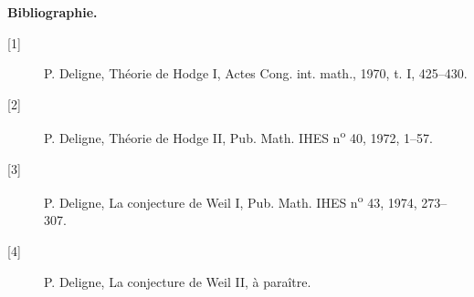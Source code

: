 
\begin{center}\textbf{Bibliographie.}\end{center}
\begin{description}
\item[{[1]}] P. Deligne, Théorie de Hodge I, Actes Cong. int. math., 1970, t. I, 425--430.
\item[{[2]}] P. Deligne, Théorie de Hodge II, Pub. Math. IHES n\textsuperscript{o} 40, 1972, 1--57.
\item[{[3]}] P. Deligne, La conjecture de Weil I, Pub. Math. IHES n\textsuperscript{o} 43, 1974, 273--307.
\item[{[4]}] P. Deligne, La conjecture de Weil II, à paraître.
\end{description}
